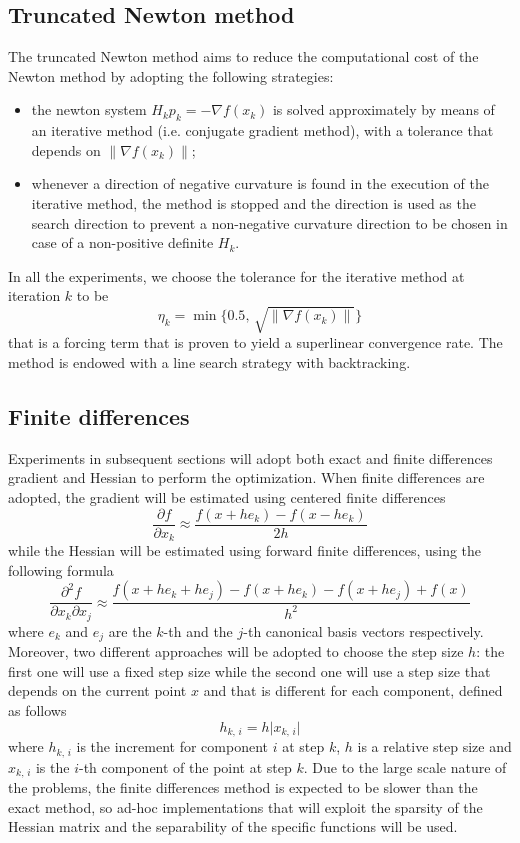 \subsection{Truncated Newton method}

The truncated Newton method aims to reduce the computational cost of the Newton method by adopting the following strategies:
\begin{itemize}
    \item the newton system $H_k p_k = -\nabla f(x_k)$ is solved approximately by means of an iterative method (i.e. conjugate gradient method), with a tolerance that depends on $\lVert \nabla f(x_k) \rVert$;
    \item whenever a direction of negative curvature is found in the execution of the iterative method, the method is stopped and the direction is used as the search direction to prevent a non-negative curvature direction to be chosen in case of a non-positive definite $H_k$.
\end{itemize}
In all the experiments, we choose the tolerance for the iterative method at iteration $k$ to be 
\[
\eta_k = \min\{0.5,\, \sqrt{\lVert \nabla f(x_k) \rVert}\}
\]
that is a forcing term that is proven to yield a superlinear convergence rate.
The method is endowed with a line search strategy with backtracking.

\subsection{Finite differences}

Experiments in subsequent sections will adopt both exact and finite differences gradient and Hessian to perform the optimization.
When finite differences are adopted, the gradient will be estimated using centered finite differences
\begin{equation}
    \label{eq:findiff_gradient}
    \frac{\partial f}{\partial x_k} \approx \frac{f(x + he_k) - f(x - he_k)}{2h}
\end{equation}
while the Hessian will be estimated using forward finite differences, using the following formula
\begin{equation}
    \label{eq:findiff_hessian}
    \frac{\partial^2 f}{\partial x_k \partial x_j} \approx \frac{f(x + he_k + he_j) - f(x + he_k) - f(x + he_j) + f(x)}{h^2}
\end{equation}
where $e_k$ and $e_j$ are the $k$-th and the $j$-th canonical basis vectors respectively.
Moreover, two different approaches will be adopted to choose the step size $h$: the first one will use a fixed step size while the second one will use a step size that depends on the current point $x$ and that is different for each component, defined as follows
\[
h_{k,\,i} = h \lvert x_{k,\,i} \rvert
\]
where $h_{k,\,i}$ is the increment for component $i$ at step $k$, $h$ is a relative step size and $x_{k,\,i}$ is the $i$-th component of the point at step $k$.
Due to the large scale nature of the problems, the finite differences method is expected to be slower than the exact method, so ad-hoc implementations that will exploit the sparsity of the Hessian matrix and the separability of the specific functions will be used.